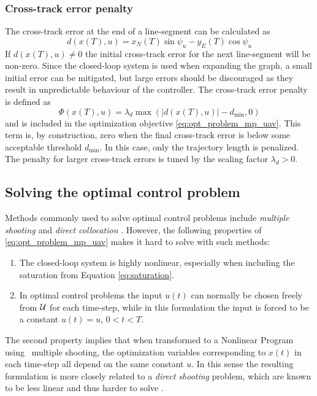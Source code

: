 \subsubsection{Cross-track error penalty}
The cross-track error at the end of a line-segment can be calculated as 
\begin{equation}
    d(x(T), u) = x_{N}(T)\sin\psi_u-y_{E}(T)\cos\psi_u
\end{equation}
If $d(x(T), u)\neq0$ the initial cross-track error for the next line-segment will be non-zero. 
Since the closed-loop system is used when expanding the graph, a small initial error can be mitigated, but large errors should be discouraged as they result in unpredictable behaviour of the controller.
The cross-track error penalty is defined as
\begin{equation}\label{eq:phi_d}
    \Phi(x(T), u)=\lambda_d\max(|d(x(T), u)|-d_{\text{min}},0)
\end{equation}
and is included in the optimization objective \eqref{eq:opt_problem_mp_uav}. 
This term is, by construction, zero when the final cross-track error is below some acceptable threshold $d_{\text{min}}$. In this case, only the trajectory length is penalized. 
The penalty for larger cross-track errors is tuned by the scaling factor $\lambda_d>0$.

\subsection{Solving the optimal control problem}\label{sec:solve_opt_ctrl}
Methods commonly used to solve optimal control problems include \textit{multiple shooting} 
and \textit{direct collocation} \cite{multiple_shooting}. 
However, the following properties of \eqref{eq:opt_problem_mp_uav} makes it hard to solve with such methods:
\begin{enumerate}
    \item The closed-loop system is highly nonlinear, especially when including the saturation from Equation \eqref{eq:saturation}.
    \item In optimal control problems the input $u(t)$ can normally be chosen freely from $\mathcal{U}$ for each time-step, while 
    in this formulation the input is forced to be a constant $u(t)=u$, $0<t<T$.
\end{enumerate}
The second property implies that when transformed to a Nonlinear Program using \eg\ multiple shooting,
the optimization variables corresponding to $x(t)$ in each time-step all depend on the same constant $u$. In this sense the resulting formulation is 
more closely related to a \textit{direct shooting} problem, which are known to be less linear and thus harder to solve \cite{multiple_shooting}.

